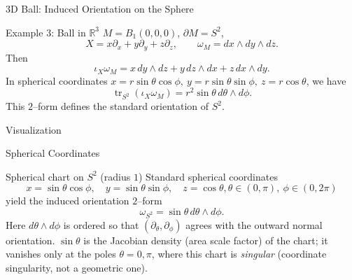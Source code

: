 \begin{frame}{3D Ball: Induced Orientation on the Sphere}
\begin{block}{Example 3: Ball in \(\mathbb{R}^3\)}
\(M=B_1(0,0,0)\), \(\partial M=S^2\),
\[
X=x\partial_x+y\partial_y+z\partial_z,\qquad
\omega_M=dx\wedge dy\wedge dz.
\]
Then
\[
\iota_X\omega_M
= x\,dy\wedge dz + y\,dz\wedge dx + z\,dx\wedge dy.
\]
In spherical coordinates \(x=r\sin\theta\cos\phi,\ y=r\sin\theta\sin\phi,\ z=r\cos\theta\),
we have
\[
\operatorname{tr}_{S^2}(\iota_X\omega_M)
= r^2\sin\theta\,d\theta\wedge d\phi.
\]
This $2$–form defines the standard orientation of $S^2$.
\end{block}
\end{frame}

\begin{frame}{Visualization}
    \begin{center}
\end{center}
\end{frame}


\begin{frame}{Spherical Coordinates}
\begin{block}{Spherical chart on \(S^2\) (radius \(1\))}
Standard spherical coordinates
\vspace{-0.2cm}
\[
x=\sin\theta\cos\phi,\quad
y=\sin\theta\sin\phi,\quad
z=\cos\theta, \theta\in(0,\pi),\ \phi\in(0,2\pi)
\]
yield the induced orientation $2$–form
\vspace{-0.2cm}
\[
\omega_{S^2}=\sin\theta\,d\theta\wedge d\phi.
\]
Here \(d\theta\wedge d\phi\) is ordered so that \((\partial_\theta,\partial_\phi)\) agrees with the outward normal orientation.
\(\sin\theta\) is the Jacobian density (area scale factor) of the chart; it vanishes only at the poles \(\theta=0,\pi\), where this chart is \emph{singular} (coordinate singularity, not a geometric one).
\end{block}

\end{frame}

